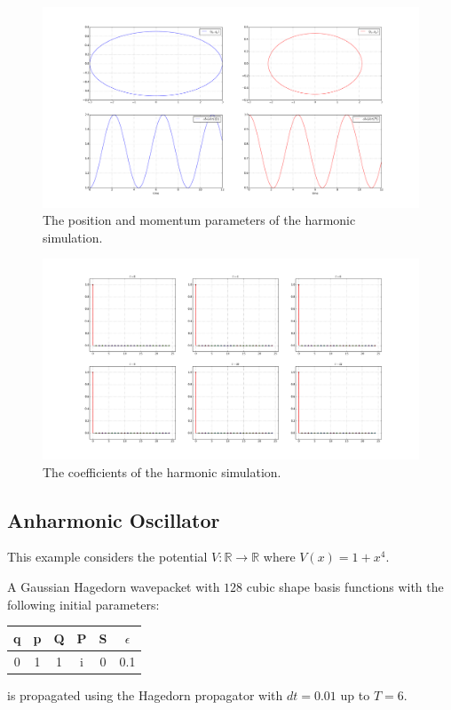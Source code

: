 \begin{figure}[!ht]
\includegraphics[width=\textwidth]{Figures/harmonic_params.pdf}
\caption{The position and momentum parameters of the harmonic simulation.}
\label{fig:harmonic_params}
\end{figure}
\begin{figure}[!ht]
\includegraphics[width=\textwidth]{Figures/harmonic_coeffs.pdf}
\caption{The coefficients of the harmonic simulation.}
\label{fig:harmonic_coeffs}
\end{figure}

\FloatBarrier


\subsection{Anharmonic Oscillator}
This example considers the potential $V: \mathbb{R} \rightarrow \mathbb{R}$ where $V(x) = 1 + x^4$.

A Gaussian Hagedorn wavepacket with $128$ cubic shape basis functions with the following initial parameters:
\begin{center}
 \begin{tabular}{|c c c c c c|} 
 \hline
 q & p & Q & P & S & $\epsilon$\\ [0.5ex] 
 \hline
 0 & 1 & 1 & i & 0 & 0.1\\ 
 \hline
\end{tabular}
\end{center}
is propagated using the Hagedorn propagator with $dt = 0.01$ up to $T = 6$.

